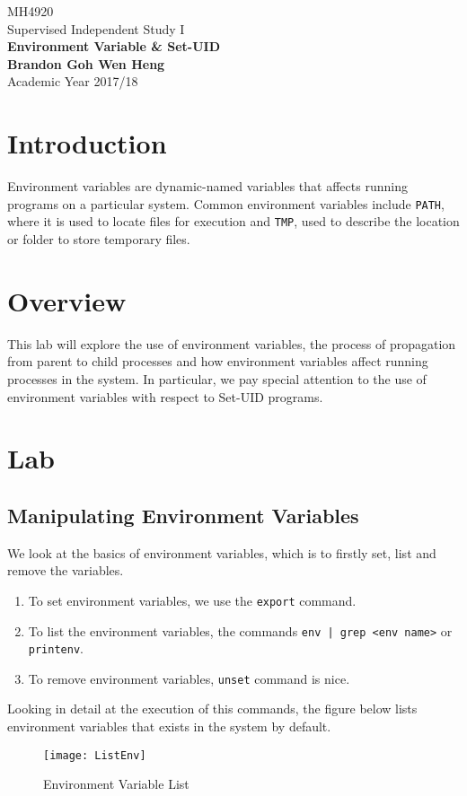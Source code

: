\documentclass[a4paper,12pt]{article}
\begin{document}
	\begin{titlepage}
		\begin{center}
			\vspace*{9em}
			\Huge 
			MH4920\\ Supervised Independent Study I\\
			\vspace*{4em}
			\LARGE
			\textbf{Environment Variable \& Set-UID\\}		
			\vspace{4em}
			\textbf{Brandon Goh Wen Heng}\\
			\vspace*{4em}
			Academic Year 2017/18
			\vfill
		\end{center}
	\end{titlepage}
\tableofcontents
\newpage
{}
\section{Introduction}
Environment variables are dynamic-named variables that affects running programs on a particular system. Common environment variables include \texttt{PATH}, where it is used to locate files for execution and \texttt{TMP}, used to describe the location or folder to store temporary files.
\section{Overview}
This lab will explore the use of environment variables, the process of propagation from parent to child processes and how environment variables affect running processes in the system. In particular, we pay special attention to the use of environment variables with respect to Set-UID programs.
\newpage
\section{Lab}
\subsection{Manipulating Environment Variables}
{\par \noindent We look at the basics of environment variables, which is to firstly set, list and remove the variables.}
\begin{enumerate}
	\item To set environment variables, we use the \texttt{export} command.
	\item To list the environment variables, the commands \texttt{env | grep <env name>} or \texttt{printenv}.
	\item To remove environment variables, \texttt{unset} command is nice.
\end{enumerate}
{\par \noindent Looking in detail at the execution of this commands, the figure below lists environment variables that exists in the system by default.}
\begin{figure}[H]
	\centering
	\texttt{[image: ListEnv]}
	\caption{Environment Variable List}
	\label{fig:listenv}
\end{figure}
\end{document}
